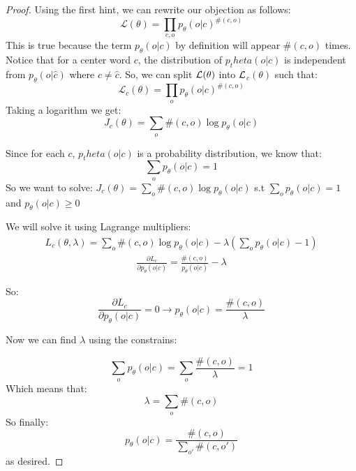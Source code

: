 \begin{proof}
    Using the first hint, we can rewrite our objection as follows:
    \begin{equation*}
            \mathcal{L}(\theta) = \prod_{c,o} p_{\theta}(o|c)^{\#(c,o)}
    \end{equation*}
    This is true because the term $p_\theta(o|c)$ by definition will appear $\#(c,o)$ times.
    Notice that for a center word $c$, the distribution of $p_theta(o|c)$ is independent from $p_\theta(o|\hat{c})$ where $c\neq\hat{c}$.
    So, we can split $\cal{L}(\theta)$ into $\cal{L}$$_c(\theta)$ such that:
    \begin{equation*}
            \mathcal{L}_c(\theta) = \prod_{o} p_{\theta}(o|c)^{\#(c,o)}
    \end{equation*}
    Taking a logarithm we get:
    \begin{equation*}
            J_c(\theta) = \sum_{o} \#(c,o)\log{p_{\theta}(o|c)}
    \end{equation*}

    Since for each $c$, $p_theta(o|c)$ is a probability distribution, we know that:
    \begin{equation*}
            \sum_{o}p_{\theta}(o|c)=1
    \end{equation*}
    So we want to solve: $J_c(\theta) = \sum_{o} \#(c,o)\log{p_{\theta}(o|c)}$ s.t $\sum_{o}p_{\theta}(o|c)=1$  and  $p_{\theta}(o|c)\ge0$

    We will solve it using Lagrange multipliers:
    \begin{equation*}
        \begin{split}
            L_c(\theta,\lambda)=\sum_{o}\#(c,o)\log{p_{\theta}(o|c)}-\lambda(\sum_{o}p_{\theta}(o|c)-1)
        \end{split}
    \end{equation*}
    \begin{equation*}
        \begin{split}
            \frac{\partial L_c}{\partial p_{\theta}(o|c)}=\frac{\#(c,o)}{p_{\theta}(o|c)}-\lambda
        \end{split}
    \end{equation*}

    So: 
    \begin{equation*}
        \frac{\partial L_c}{\partial p_{\theta}(o|c)}=0\rightarrow p_{\theta}(o|c)=\frac{\#(c,o)}{\lambda}
    \end{equation*}

    Now we can find $\lambda$ using the constrains:
    
    \begin{equation*}
        \sum_{o} p_\theta(o|c)= \sum_{o}\frac{\#(c,o)}{\lambda}=1
    \end{equation*}
    Which means that:
    \begin{equation*}
        \lambda = \sum_{o}\#(c,o)
    \end{equation*}
    So finally:
    \begin{equation*}
        p_\theta(o|c) = \frac{\#(c,o)}{\sum_{o'}\#(c,o')}
    \end{equation*}
    as desired.
\end{proof}
